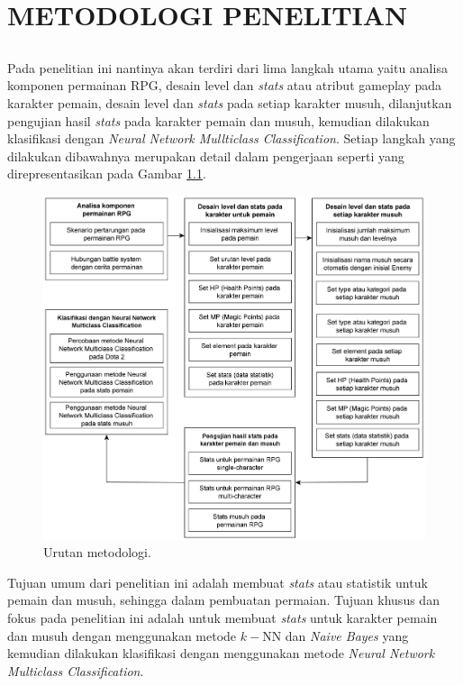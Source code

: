 \chapter{METODOLOGI PENELITIAN}
\label{chap:chap3_metodologi}

\section*{}
Pada penelitian ini nantinya akan terdiri dari lima langkah utama yaitu analisa komponen permainan RPG, desain level dan \textit{stats} atau atribut gameplay pada karakter pemain, desain level dan \textit{stats} pada setiap karakter musuh, dilanjutkan pengujian hasil \textit{stats} pada karakter pemain dan musuh, kemudian dilakukan klasifikasi dengan \textit{Neural Network Mullticlass Classification}. Setiap langkah yang dilakukan dibawahnya merupakan detail dalam pengerjaan seperti yang direpresentasikan pada Gambar \ref{fig:metodologi}.
\vspace{1ex}

\begin{figure} [!h] \centering
	\includegraphics[scale=0.12]{img/metodologi_5.png}
	\caption{Urutan metodologi.}
	\label{fig:metodologi}
\end{figure}
\vspace{1ex}

Tujuan umum dari penelitian ini adalah membuat \textit{stats} atau statistik untuk pemain dan musuh, sehingga dalam pembuatan permaian. Tujuan khusus dan fokus pada penelitian ini adalah untuk membuat \textit{stats} untuk karakter pemain dan musuh dengan menggunakan metode $k-$NN dan \textit{Naive Bayes} yang kemudian dilakukan klasifikasi dengan menggunakan metode \textit{Neural Network} \textit{Multiclass Classification}.
\vspace{1ex}

